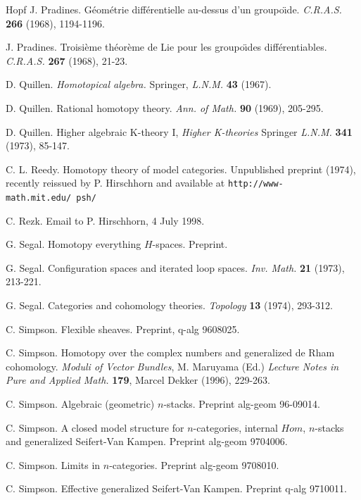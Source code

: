 \begin{thebibliography}{Hopf}
J. Pradines. G\'eom\'etrie diff\'erentielle au-dessus d'un
groupo\"{\i}de. {\em C.R.A.S.} {\bf 266} (1968), 1194-1196.

J. Pradines. Troisi\`eme th\'eor\`eme de Lie pour les groupo\"{\i}des
diff\'erentiables.
{\em C.R.A.S.} {\bf 267} (1968), 21-23.

D. Quillen. {\em Homotopical algebra.} Springer, {\em L.N.M.} {\bf 43} (1967).

D. Quillen. Rational homotopy theory. {\em Ann. of Math.} {\bf 90} (1969),
205-295.

D. Quillen. Higher algebraic K-theory I, {\em Higher K-theories} Springer {\em
L.N.M.} {\bf 341} (1973), 85-147.

C. L. Reedy. Homotopy theory of model categories. Unpublished preprint (1974),
recently reissued by P. Hirschhorn and available at \newline
{\tt http://www-math.mit.edu/~psh/}

C. Rezk. Email to P. Hirschhorn, 4 July 1998.

G. Segal. Homotopy everything $H$-spaces. Preprint.

G. Segal. Configuration spaces and iterated loop spaces. {\em Inv. Math.} {\bf
21} (1973), 213-221.

G. Segal. Categories and cohomology theories. {\em Topology} {\bf 13}
(1974), 293-312.

C. Simpson. Flexible sheaves. Preprint, q-alg 9608025.

C. Simpson. Homotopy over the complex numbers and generalized de Rham
cohomology. {\em Moduli of Vector Bundles}, M. Maruyama (Ed.) {\em Lecture
Notes in Pure and Applied Math.} {\bf 179}, Marcel Dekker (1996), 229-263.

C. Simpson. Algebraic (geometric) $n$-stacks. Preprint alg-geom
96-09014.

C. Simpson. A closed model structure for $n$-categories, internal $Hom$,
$n$-stacks and generalized Seifert-Van Kampen. Preprint alg-geom 9704006.

C. Simpson. Limits in $n$-categories. Preprint alg-geom 9708010.

C. Simpson. Effective generalized Seifert-Van Kampen.
Preprint q-alg 9710011.


\end{thebibliography}
